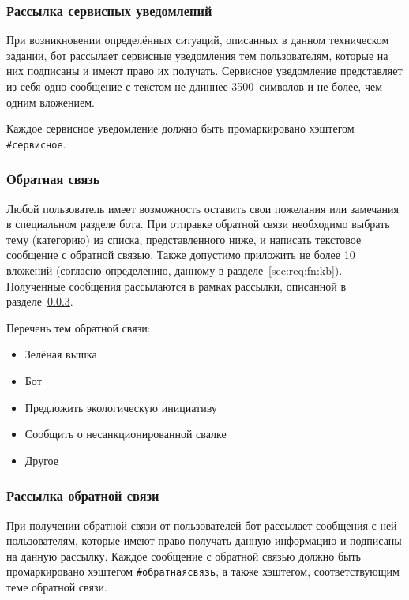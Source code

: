 \subsubsection{Рассылка сервисных уведомлений}
    \label{sec:req:fn:service}
    При возникновении определённых ситуаций, описанных в данном техническом задании,
    бот рассылает сервисные уведомления тем пользователям, которые на них подписаны и имеют
    право их получать. Сервисное уведомление представляет из себя одно сообщение с текстом
    не длиннее 3500~символов и не более, чем одним вложением.

    Каждое сервисное уведомление должно быть промаркировано хэштегом \hbox{\texttt{\#сервисное}}.

\subsubsection{Обратная связь}
    \label{sec:req:fn:feedback}
    Любой пользователь имеет возможность оставить свои пожелания или замечания в специальном
    разделе бота. При отправке обратной связи необходимо выбрать тему (категорию) из списка,
    представленного ниже, и написать текстовое сообщение с обратной связью.
    Также допустимо приложить не более 10 вложений (согласно определению, данному в
    разделе~\ref{sec:req:fn:kb}). Полученные сообщения рассылаются в рамках рассылки,
    описанной в разделе~\ref{sec:req:fn:feedbacknl}.

    Перечень тем обратной связи:
    \begin{itemize}
        \item
            Зелёная вышка
        \item
            Бот
        \item
            Предложить экологическую инициативу
        \item
            Сообщить о несанкционированной свалке
        \item
            Другое
    \end{itemize}

\subsubsection{Рассылка обратной связи}
    \label{sec:req:fn:feedbacknl}
    При получении обратной связи от пользователей бот рассылает сообщения с ней пользователям,
    которые имеют право получать данную информацию и подписаны на данную рассылку.
    Каждое сообщение с обратной связью должно быть промаркировано хэштегом \hbox{\texttt{\#обратнаясвязь}},
    а также хэштегом, соответствующим теме обратной связи.

